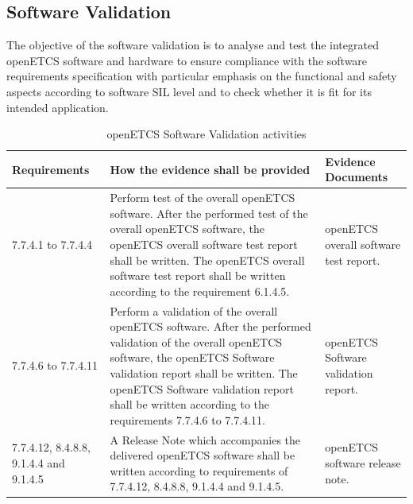 \documentclass{template/openetcs_report}
\begin{document}
\subsection{Software Validation}
\label{ValSW}
\begin{flushleft}
The objective of the software validation is to analyse and test the integrated openETCS software and hardware to ensure compliance with the software requirements specification with particular emphasis on the functional and safety aspects according to software SIL level and to check whether it is fit for its intended application.
\end{flushleft}
{\footnotesize\sffamily\centering
\begin{longtable}{|p{2cm}|p{9cm}|p{3cm}|}
\caption{openETCS Software Validation activities}\\
\hline
\bfseries Requirements & \bfseries How the evidence shall be provided & \bfseries Evidence Documents\\
\hline
\hline
\endhead
\hline
\endfoot

7.7.4.1 to 7.7.4.4 & Perform test of the overall openETCS software.
After the performed test of the overall openETCS software, the openETCS overall software test report shall be written. 
The openETCS overall software test report shall be written according to the requirement 6.1.4.5. & openETCS overall software test report.\\ 
\hline
7.7.4.6 to 7.7.4.11 & Perform a validation of the overall openETCS software.
After the performed validation of the overall openETCS software, the openETCS Software validation report shall be written. 
The openETCS Software validation report shall be written according to the requirements 7.7.4.6 to 7.7.4.11. & openETCS Software validation report.\\ 
\hline
7.7.4.12, 8.4.8.8, 9.1.4.4 and 9.1.4.5 & A Release Note which accompanies the delivered openETCS software shall be written according to requirements of 7.7.4.12, 8.4.8.8, 9.1.4.4 and 9.1.4.5.
& openETCS software release note.\\ 
\hline
\end{longtable}}
\end{document}
